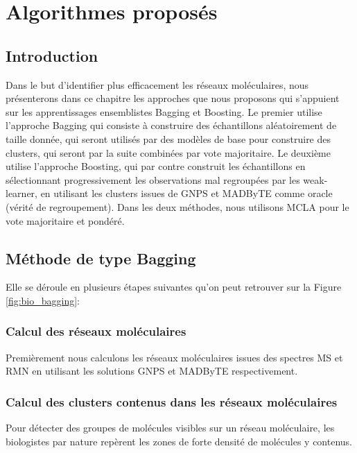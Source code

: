 \chapter{Algorithmes proposés}

\section{Introduction}

Dans le but d'identifier plus efficacement les réseaux moléculaires, nous présenterons dans ce chapitre les approches que nous proposons qui s'appuient sur les apprentissages ensemblistes Bagging et Boosting.
Le premier utilise l’approche \acrshort{Bagging} qui consiste à construire des échantillons aléatoirement de taille donnée, qui seront utilisés par des modèles de base pour construire des clusters, qui seront par la suite combinées par vote majoritaire.
Le deuxième utilise l’approche Boosting, qui par contre construit les échantillons en sélectionnant progressivement les observations mal regroupées par les weak-learner, en utilisant les clusters issues de \acrshort{GNPS} et \acrshort{MADByTE} comme oracle (vérité de regroupement).
Dans les deux méthodes, nous utilisons MCLA pour le vote majoritaire et pondéré.


\section{Méthode de type Bagging}

    Elle se déroule en plusieurs étapes suivantes qu'on peut retrouver sur la Figure \ref{fig:bio_bagging}:
    
   	 \subsection{Calcul des réseaux moléculaires}
  	 
		 Premièrement nous calculons les réseaux moléculaires issues des spectres MS et RMN en utilisant les solutions GNPS et MADByTE respectivement.
    
		 \subsection{Calcul des clusters contenus dans les réseaux moléculaires}
    
		 Pour détecter des groupes de molécules visibles sur un réseau moléculaire, les biologistes par nature repèrent les zones de forte densité de molécules y contenus.
 	 

